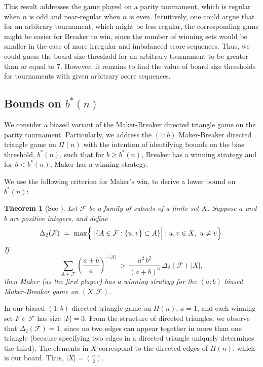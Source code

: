 \documentclass{article}
\theoremstyle{definition}
\theoremstyle{plain}
\newtheorem{theo}{Theorem}[section]
\theoremstyle{remark}
\theoremstyle{definition}
\begin{document}
This result addresses the game played on a parity tournament, which is regular when $n$ is odd and near-regular when $n$ is even. Intuitively, one could argue that for an arbitrary tournament, which might be less regular, the corresponding game might be easier for Breaker to win, since the number of winning sets would be smaller in the case of more irregular and imbalanced score sequences. Thus, we could guess the board size threshold for an arbitrary tournament to be greater than or equal to $7$. However, it remains to find the value of board size thresholds for tournaments with given arbitrary score sequences.

\subsection{\texorpdfstring{Bounds on $b^*(n)$}{Bounds on b*(n)}}

 We consider a biased variant of the Maker-Breaker directed triangle game on the parity tournament. Particularly, we address the $(1:b)$ Maker-Breaker directed triangle game on $\Pi(n)$ with the intention of identifying bounds on the bias threshold, $b^*(n)$, such that for $b\ge b^*(n)$, Breaker has a winning strategy and for $b<b^*(n)$, Maker has a winning strategy.
 
 We use the following criterion for Maker's win, to derive a lower bound on $b^*(n)$:
 
\begin{theo}[See \cite{beck2008combinatorial}]\label{thm:BeckMakerCriterion}
    Let $\mathcal{F}$ be a family of subsets of a finite set $X$. Suppose $a$ and $b$ are positive integers, and define
    \[
    \Delta_2(\mathcal{F}) \ =\  \max\Bigl\{\,\Bigl|\{A\in\mathcal{F}:\{u,v\}\subset A\}\Bigr| : u,v\in X,\  u\neq v \Bigr\}.
    \]
    If
    \begin{equation}
      \sum_{A\in \mathcal{F}} \left(\frac{a+b}{a}\right)^{-|A|} \ >\  \frac{a^2\,b^2}{(a+b)^3}\,\Delta_2(\mathcal{F})\,|X|,
     \label{Beck'sMakerinequality}  
    \end{equation}
    then Maker (as the first player) has a winning strategy for the $(a:b)$ biased Maker-Breaker game on $(X,\mathcal{F})$.
\end{theo}

In our biased $(1:b)$ directed triangle game on $\Pi(n)$, $a=1$, and each winning set $F \in \mathcal{F}$ has size $|F| = 3$. From the structure of directed triangles, we observe that $\Delta_2(\mathcal{F}) = 1$, since no two edges can appear together in more than one triangle (because specifying two edges in a directed triangle uniquely determines the third). The elements in $X$ correspond to the directed edges of $\Pi(n)$, which is our board. Thus, $|X| = \binom{n}{2}$.
\end{document}

